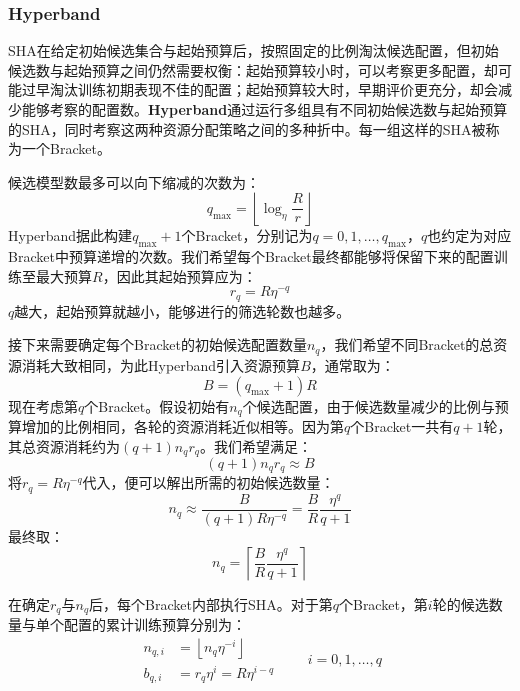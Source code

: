 \subsubsection{Hyperband}
SHA在给定初始候选集合与起始预算后，按照固定的比例淘汰候选配置，但初始候选数与起始预算之间仍然需要权衡：起始预算较小时，可以考察更多配置，却可能过早淘汰训练初期表现不佳的配置；起始预算较大时，早期评价更充分，却会减少能够考察的配置数。\textbf{Hyperband}通过运行多组具有不同初始候选数与起始预算的SHA，同时考察这两种资源分配策略之间的多种折中。每一组这样的SHA被称为一个\gls{Bracket}。\par
候选模型数最多可以向下缩减的次数为：
\begin{equation*}
	q_{\max}=\left\lfloor\log_\eta\frac{R}{r}\right\rfloor
\end{equation*}
Hyperband据此构建$q_{\max}+1$个Bracket，分别记为$q=0,1,\dots,q_{\max}$，$q$也约定为对应Bracket中预算递增的次数。我们希望每个Bracket最终都能够将保留下来的配置训练至最大预算$R$，因此其起始预算应为：
\begin{equation*}
	r_q=R\eta^{-q}
\end{equation*}
$q$越大，起始预算就越小，能够进行的筛选轮数也越多。\par
接下来需要确定每个Bracket的初始候选配置数量$n_q$，我们希望不同Bracket的总资源消耗大致相同，为此Hyperband引入资源预算$B$，通常取为：
\begin{equation*}
	B=(q_{\max}+1)R
\end{equation*}
现在考虑第$q$个Bracket。假设初始有$n_q$个候选配置，由于候选数量减少的比例与预算增加的比例相同，各轮的资源消耗近似相等。因为第$q$个Bracket一共有$q+1$轮，其总资源消耗约为$(q+1)n_qr_q$。我们希望满足：
\begin{equation*}
	(q+1)n_qr_q\approx B
\end{equation*}
将$r_q=R\eta^{-q}$代入，便可以解出所需的初始候选数量：
\begin{equation*}
	n_q\approx\frac{B}{(q+1)R\eta^{-q}}=\frac{B}{R}\frac{\eta^q}{q+1}
\end{equation*}
最终取：
\begin{equation*}
	n_q=\left\lceil\frac{B}{R}\frac{\eta^q}{q+1}\right\rceil
\end{equation*}\par
在确定$r_q$与$n_q$后，每个Bracket内部执行SHA。对于第$q$个Bracket，第$i$轮的候选数量与单个配置的累计训练预算分别为：
\begin{equation*}
	\begin{aligned}
		n_{q,i}&=\left\lfloor n_q\eta^{-i}\right\rfloor\\
		b_{q,i}&=r_q\eta^i=R\eta^{i-q}
	\end{aligned}
	\qquad i=0,1,\dots,q
\end{equation*}
